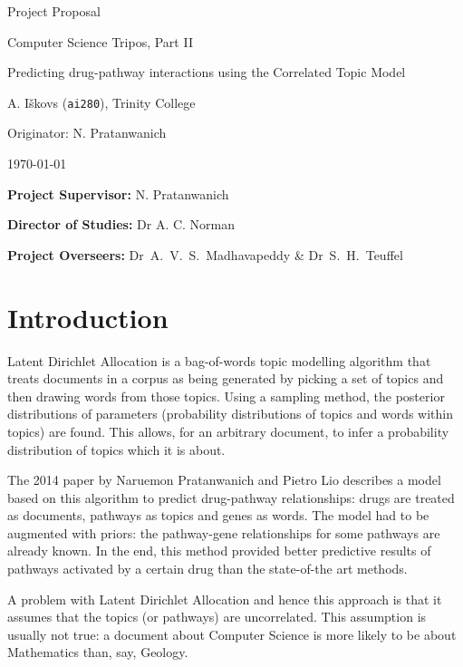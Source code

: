 \documentclass[12pt,a4]{article}
\begin{document}
\vfil

\centerline{\large Project Proposal}
\vspace{0.3in}
\centerline{\large Computer Science Tripos, Part II}
\vspace{0.3in}
\centerline{\Large Predicting drug-pathway interactions using the Correlated Topic Model}
\vspace{0.4in}
\centerline{\large A. I\v{s}kovs (\texttt{ai280}), Trinity College}
\vspace{0.3in}
\centerline{\large Originator: N. Pratanwanich}
\vspace{0.3in}
\centerline{\large \today}

\vfil


\noindent
{\bf Project Supervisor:} N. Pratanwanich
\vspace{0.2in}

\noindent
{\bf Director of Studies:} Dr A. C. Norman
\vspace{0.2in}
\noindent
 
\noindent
{\bf Project Overseers:} Dr~A.~V.~S.~Madhavapeddy  \& Dr~S.~H.~Teuffel

\pagebreak


\section*{Introduction}

Latent Dirichlet Allocation\cite{Blei} is a bag-of-words topic modelling algorithm that treats documents in a corpus as being generated by picking a set of topics and then drawing words from those topics. Using a sampling method, the posterior distributions of parameters (probability distributions of topics and words within topics) are found. This allows, for an arbitrary document, to infer a probability distribution of topics which it is about.

The 2014 paper\cite{Pratanwanich2014} by Naruemon Pratanwanich and Pietro Lio describes a model based on this algorithm to predict drug-pathway relationships:  drugs are treated as documents, pathways as topics and genes as words. The model had to be augmented with priors: the pathway-gene relationships for some pathways are already known. In the end, this method provided better predictive results of pathways activated by a certain drug than the state-of-the art methods.

A problem with Latent Dirichlet Allocation and hence this approach is that it assumes that the topics (or pathways) are uncorrelated. This assumption is usually not true: a document about Computer Science is more likely to be about Mathematics than, say, Geology. 
\end{document}
